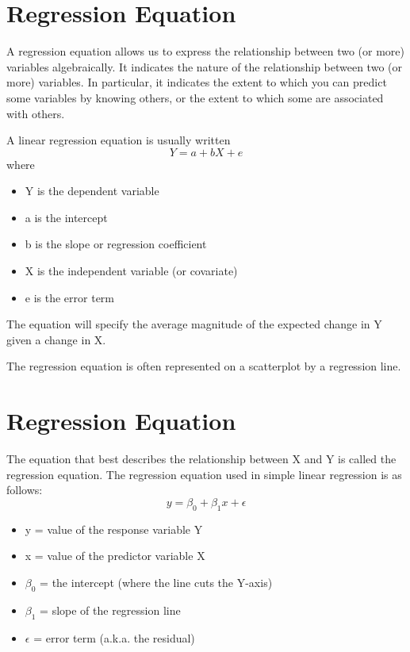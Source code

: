 \documentclass[]{report}
\begin{document}


\section{Regression Equation}
A regression equation allows us to express the relationship between two (or more) variables algebraically. It indicates the nature of the relationship between two (or more) variables. In particular, it indicates the extent to which you can predict some variables by knowing others, or the extent to which some are associated with others.



A linear regression equation is usually written
\[Y = a + bX + e\]
where
\begin{itemize}
	\item Y is the dependent variable
	\item a is the intercept
	\item b is the slope or regression coefficient
	\item X is the independent variable (or covariate)
	\item e is the error term
\end{itemize}
The equation will specify the average magnitude of the expected change in Y given a change in X.

The regression equation is often represented on a scatterplot by a regression line.



\section{Regression Equation}
The equation that best describes the relationship between X and Y is called
the regression equation. The regression equation used in simple linear
regression is as follows:
\[ y = \beta_0 + \beta_1x + \epsilon \]
\begin{itemize}
	\item y = value of the response variable Y
	\item x = value of the predictor variable X
	\item $\beta_0$ = the intercept (where the line cuts the Y-axis)
	\item $\beta_1$ = slope of the regression line
	\item $\epsilon$ = error term (a.k.a. the residual)
\end{itemize}			
			
\end{document}
